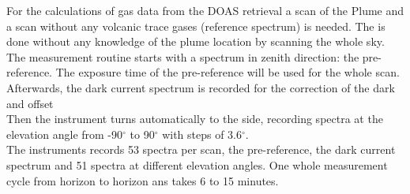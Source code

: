 		For the calculations of gas data from the DOAS retrieval a scan of the Plume and a scan without any volcanic trace gases (reference spectrum) is needed.  The is done without any knowledge of the plume location by scanning the whole sky. 
		The measurement routine starts with a spectrum in zenith direction: the pre-reference. The exposure time of the pre-reference will be used for the whole scan.
		Afterwards, the dark current spectrum is recorded for the correction of the dark and offset\\
		Then the instrument turns automatically to the side, recording spectra at the elevation angle from -90$^{\circ}$ to 90$^{\circ}$ with steps of 3.6$^{\circ}$. \\
		The instruments records 53 spectra per scan, the pre-reference, the dark current spectrum and 51 spectra at different elevation angles.
		One whole measurement cycle from horizon to horizon ans takes 6 to 15 minutes.